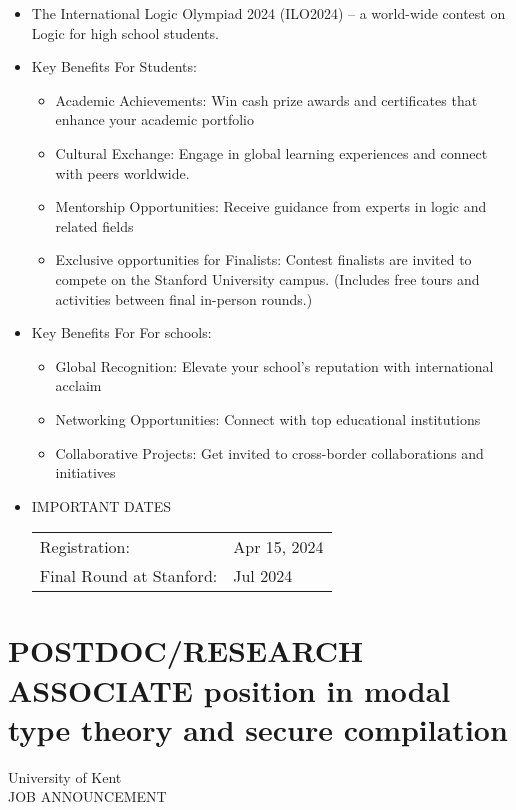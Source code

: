 \documentclass[prodmode,acmtecs]{acmsmall} %
\begin{document}
\begin{itemize}\item  The International Logic Olympiad 2024 (ILO2024) – a world-wide contest on Logic for high school students. 
 
\item  Key Benefits For Students: 
 
\begin{itemize}\item  Academic Achievements: Win cash prize awards and certificates that enhance your academic portfolio
\item  Cultural Exchange: Engage in global learning experiences and connect with peers worldwide.
\item  Mentorship Opportunities: Receive guidance from experts in logic and related fields
\item  Exclusive opportunities for Finalists: Contest finalists are invited to compete on the Stanford University campus. (Includes free tours and activities between final in-person rounds.)
\end{itemize} 
\item  Key Benefits For For schools: 
 
\begin{itemize}\item  Global Recognition: Elevate your school’s reputation with international acclaim
\item  Networking Opportunities: Connect with top educational institutions
\item  Collaborative Projects: Get invited to cross-border collaborations and initiatives
\end{itemize} 
\item  IMPORTANT DATES  
 
\begin{tabulary}{\linewidth}{LL}Registration:  & Apr 15, 2024 \\
Final Round at Stanford:  & Jul 2024 \\
\end{tabulary}
 
\end{itemize}\section{POSTDOC/RESEARCH ASSOCIATE position in modal type theory and secure compilation}\label{POSTDOCRESEARCHASSOCIATEpositioninmodaltypetheoryandsecurecompilation}   University of Kent\\ 
JOB ANNOUNCEMENT 
\end{document}

